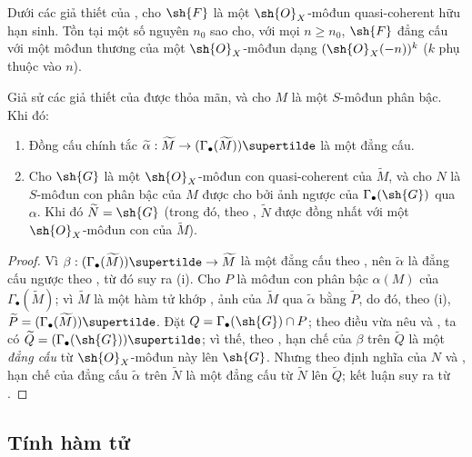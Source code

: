 \documentclass[oneside,10pt]{amsart}
\makeatletter
\renewcommand{\geq}{\geqslant}
\newcommand{\ega@arrow}[2]{\mathchoice{#1}{#2}{#2}{#2}}
\renewcommand{\to}{\ega@arrow{\longrightarrow}{\rightarrow}}
\let\EGAOriginalLabel\label
\renewcommand{\label}[1]{\phantomsection\EGAOriginalLabel{#1}}
\makeatother
\begin{document}
\begin{corollary}[2.7.10]
\label{II.2.7.10}
Dưới các giả thiết của , cho $\sh{F}$ là một $\sh{O}_X$-môđun quasi-coherent hữu hạn sinh.
Tồn tại một số nguyên $n_0$ sao cho, với mọi $n\geq n_0$, $\sh{F}$ đẳng cấu với một môđun thương của một $\sh{O}_X$-môđun dạng $(\sh{O}_X(-n))^k$ ($k$ phụ thuộc vào $n$).
\end{corollary}

\begin{proposition}[2.7.11]
\label{II.2.7.11}
Giả sử các giả thiết của  được thỏa mãn, và cho $M$ là một $S$-môđun phân bậc.
Khi đó:
\begin{enumerate}
  \item[\rm{(i)}] Đồng cấu chính tắc $\widetilde{\alpha}:\widetilde{M}\to(\Gamma_\bullet(\widetilde{M}))\supertilde$ là một đẳng cấu.
  \item[\rm{(ii)}] Cho $\sh{G}$ là một $\sh{O}_X$-môđun con quasi-coherent của $\widetilde{M}$, và cho $N$ là $S$-môđun con phân bậc của $M$ được cho bởi ảnh ngược của $\Gamma_\bullet(\sh{G})$ qua $\alpha$.
    Khi đó $\widetilde{N}=\sh{G}$ (trong đó, theo , $\widetilde{N}$ được đồng nhất với một $\sh{O}_X$-môđun con của $\widetilde{M}$).
\end{enumerate}
\end{proposition}

\begin{proof}
Vì $\beta:(\Gamma_\bullet(\widetilde{M}))\supertilde\to\widetilde{M}$ là một đẳng cấu theo , nên $\widetilde{\alpha}$ là đẳng cấu ngược theo , từ đó suy ra (i).
Cho $P$ là môđun con phân bậc $\alpha(M)$ của $\Gamma_\bullet(\widetilde{M})$;
vì $\widetilde{M}$ là một hàm tử khớp , ảnh của $\widetilde{M}$ qua $\widetilde{\alpha}$ bằng $\widetilde{P}$, do đó, theo (i), $\widetilde{P}=(\Gamma_\bullet(\widetilde{M}))\supertilde$.
Đặt $Q=\Gamma_\bullet(\sh{G})\cap P$;
theo điều vừa nêu và , ta có $\widetilde{Q}=(\Gamma_\bullet(\sh{G}))\supertilde$; vì thế, theo , hạn chế của $\beta$ trên $\widetilde{Q}$ là một \emph{đẳng cấu} từ $\sh{O}_X$-môđun này lên $\sh{G}$.
Nhưng theo định nghĩa của $N$ và , hạn chế của đẳng cấu $\widetilde{\alpha}$ trên $\widetilde{N}$ là một đẳng cấu từ $\widetilde{N}$ lên $\widetilde{Q}$; kết luận suy ra từ .
\end{proof}

\subsection{Tính hàm tử}
\label{subsection:II.2.8}
\end{document}
